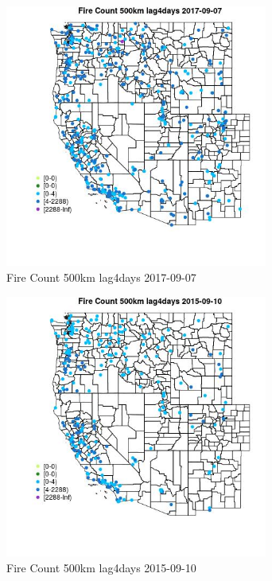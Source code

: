\begin{figure} 
\centering  
\includegraphics[width=0.77\textwidth]{Code_Outputs/Report_ML_input_PM25_Step4_part_e_de_duplicated_aves_compiled_2019-05-21wNAs_MapObsFire_Count_500km_lag4days2017-09-07.jpg} 
\caption{\label{fig:Report_ML_input_PM25_Step4_part_e_de_duplicated_aves_compiled_2019-05-21wNAsMapObsFire_Count_500km_lag4days2017-09-07}Fire Count 500km lag4days 2017-09-07} 
\end{figure} 
 

\begin{figure} 
\centering  
\includegraphics[width=0.77\textwidth]{Code_Outputs/Report_ML_input_PM25_Step4_part_e_de_duplicated_aves_compiled_2019-05-21wNAs_MapObsFire_Count_500km_lag4days2015-09-10.jpg} 
\caption{\label{fig:Report_ML_input_PM25_Step4_part_e_de_duplicated_aves_compiled_2019-05-21wNAsMapObsFire_Count_500km_lag4days2015-09-10}Fire Count 500km lag4days 2015-09-10} 
\end{figure} 
 

